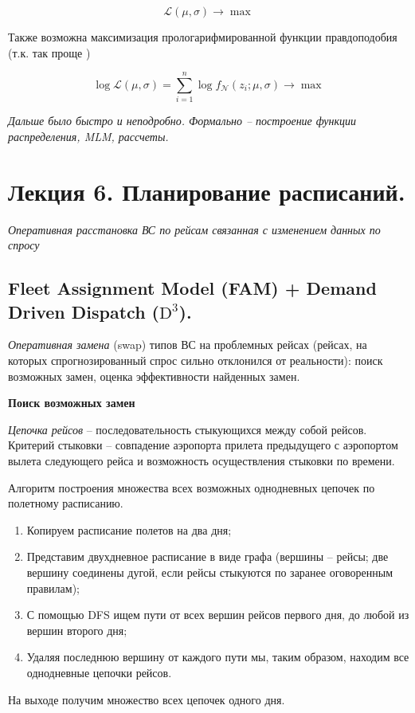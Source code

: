 \documentclass[reqno]{article}
\theoremstyle{definition}
\theoremstyle{definition}
\theoremstyle{definition}
\theoremstyle{definition}
\theoremstyle{definition}
\theoremstyle{definition}
\theoremstyle{definition}
\theoremstyle{definition}
\theoremstyle{definition}
\begin{document}
		$$\mathcal{L}(\mu, \sigma) \rightarrow \max$$
		
		Также возможна максимизация прологарифмированной функции правдоподобия (т.к. так проще )
		
		$$\log \mathcal{L}(\mu, \sigma) = \sum^n_{i = 1} \log f_\mathcal{N}(z_i; \mu, \sigma) \rightarrow \max$$
		
		\textit{Дальше было быстро и неподробно. Формально -- построение функции распределения, MLM, рассчеты.}
		
		
		
		
		\newpage
		\section{Лекция 6. Планирование расписаний.}
		
		\textit{Оперативная расстановка ВС по рейсам связанная с изменением данных по спросу}
		
		\subsection{Fleet Assignment Model (FAM) + Demand Driven Dispatch ($\text{D}^3$).}
		
		
		\textit{Оперативная замена} (swap) типов ВС на проблемных рейсах (рейсах, на которых спрогнозированный спрос сильно отклонился от реальности): поиск возможных замен, оценка эффективности найденных замен.
		
		\textbf{Поиск возможных замен}
		
		\textit{Цепочка рейсов} -- последовательность стыкующихся между собой рейсов. Критерий стыковки -- совпадение аэропорта прилета предыдущего с аэропортом вылета следующего рейса и возможность осуществления стыковки по времени.
		
		Алгоритм построения множества всех возможных однодневных цепочек по полетному расписанию.
		
		\begin{enumerate}
			\item Копируем расписание полетов на два дня;
			\item Представим двухдневное расписание в виде графа (вершины -- рейсы; две вершину соединены дугой, если рейсы стыкуются по заранее оговоренным правилам);
			\item С помощью DFS ищем пути от всех вершин рейсов первого дня, до любой из вершин второго дня;
			\item Удаляя последнюю вершину от каждого пути мы, таким образом, находим все однодневные цепочки рейсов.
		\end{enumerate}
		
		На выходе получим множество всех цепочек одного дня.
		
		
\end{document}
